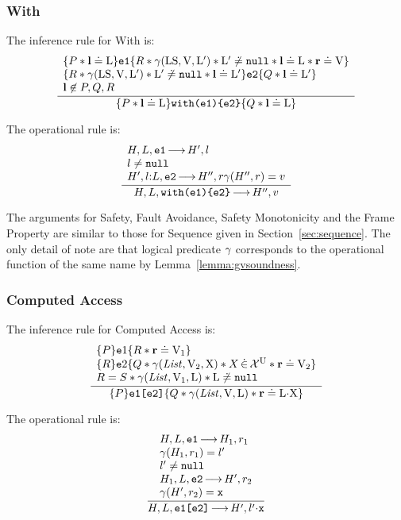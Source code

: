 \documentclass{article}
\begin{document}
\subsubsection{With}

The inference rule for With is:
\[\frac
{\begin{array}{l}
        \{P \mathbin{*} \textbf{l}\doteq{\ensuremath{\mathrm{L}}}\}\mbox{\texttt{{\upshape e1}}}\{ R \mathbin{*} \gamma({\mathrm{LS}},{\mathrm{V}},{\mathrm{L}}') \mathbin{*} {\mathrm{L}}'\not\doteq\mbox{\texttt{{\upshape null}}} \mathbin{*} \textbf{l}\doteq{\ensuremath{\mathrm{L}}}\mathbin{*} {\mathrm{\textbf{r}}}\doteq{\ensuremath{\mathrm{V}}}\} \\
\{R \mathbin{*} \gamma({\mathrm{LS}},{\mathrm{V}},{\mathrm{L}}') \mathbin{*} {\mathrm{L}}'\not\doteq\mbox{\texttt{{\upshape null}}}\mathbin{*} \textbf{l}\doteq{\ensuremath{\mathrm{L}}}'\} \mbox{\texttt{{\upshape e2}}} \{ Q\mathbin{*} \textbf{l}\doteq{\ensuremath{\mathrm{L}}}' \}\\
\textbf{l} \not\in P, Q, R\end{array}}
{\{ P \mathbin{*} \textbf{l}\doteq{\ensuremath{\mathrm{L}}}\} \mbox{\texttt{{\upshape with(e1)\{e2\}}}}\{ Q \mathbin{*} \textbf{l}\doteq{\ensuremath{\mathrm{L}}}\}}
\]

The operational rule is:
\[\frac
{\begin{array}{l}
        H,L,\mbox{\texttt{{\upshape e1}}} {\,\longrightarrow\,} H',l\\
l\neq\mbox{\texttt{{\upshape null}}}\\
 H',l{:} L,\mbox{\texttt{{\upshape e2}}} {\,\longrightarrow\,} H'', r
 \gamma(H'',r) = v
 \end{array}}
{H,L,\mbox{\texttt{{\upshape with(e1)\{e2\}}}} {\,\longrightarrow\,} H'',v}
\]

The arguments for Safety, Fault Avoidance, Safety Monotonicity and the Frame Property are similar to those for Sequence given in Section~\ref{sec:sequence}. The only detail of note are that logical predicate $\gamma$ corresponds to the operational function of the same name by Lemma~\ref{lemma:gvsoundness}.

\subsubsection{Computed Access}

The inference rule for Computed Access is:
\[\frac
{\begin{array}{l}\tr P {\js e1} {R\sep\rv\doteq\LVAL_1}\\
\tr R {\js e2} {Q\sep\getValue(\E{List},\LVAL_2,\V{X})\sep X \dotin \uvars \sep\rv\doteq\LVAL_2}\\
R = S\sep\getValue(\E{List},\LVAL_1,\V{L})\sep\V{L}\not\doteq\nil\end{array}}
{\tr P {\js{e1[e2]}} {Q\sep\getValue(\E{List},\LVAL,\V{L})\sep\rv\doteq\V{L}\sv\V{X}}}
\]

The operational rule is:
\[\frac
{\begin{array}{l}H,L,\js{e1} \levalsto H_1,\njs{r_1} \\
\getValue(H_1,\njs{r_1}) = l'\\
l'\neq \nil\\
H_1,L,\js{e2} \levalsto H',\njs{r_2}\\
\getValue(H',\njs{r_2}) = \js{x}\end{array}}
{H,L,\js{e1[e2]} \levalsto H',l'\sv \js x}
\]
\end{document}

